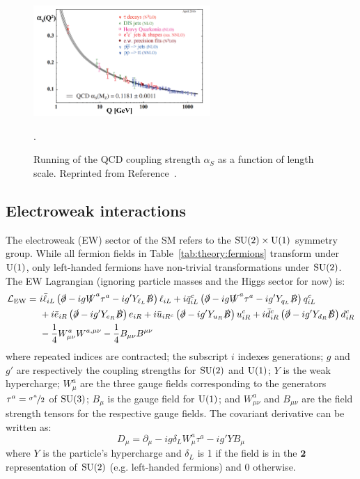 \begin{figure}[]
\begin{center}
    \includegraphics[width=0.6\textwidth]{figures/theory/alphas.png}
    \caption{Running of the QCD coupling strength $\alpha_S$ as a function of length scale.
             Reprinted from Reference~\cite{pdg}.}
    \label{fig:theory:alphas}.
\end{center}
\end{figure}

\subsection{Electroweak interactions}
\label{sec:theory:ew}
The electroweak (EW) sector of the SM refers to the $\operatorname{\mathrm{SU}}(2)\times\operatorname{\mathrm{U}}(1)$ symmetry group.
While all fermion fields in Table~\ref{tab:theory:fermions} transform under $\operatorname{\mathrm{U}}(1)$, only left-handed fermions have non-trivial transformations under $\operatorname{\mathrm{SU}}(2)$.
The EW Lagrangian (ignoring particle masses and the Higgs sector for now) is:
\begin{align}
\mathcal{L}_\mathrm{EW} =~
        & i\bar\ell_{iL} \left(\slashed\partial-ig \slashed W^a \tau^a - ig'Y_{\ell_L} \slashed B\right)\ell_{iL} 
      + i\bar q_{iL}^{c} \left(\slashed\partial-ig \slashed W^a \tau^a - ig'Y_{q_L} \slashed B\right)q_{iL}^{c} \nonumber \\
      & + i\bar e_{iR} \left(\slashed\partial-ig'Y_{ e_R}\slashed B\right) e_{iR} 
       + i\bar u_{iR^{c}} \left(\slashed\partial-ig'Y_{u_R}\slashed B\right) u_{iR}^{c} 
       + i\bar d_{iR}^{c} \left(\slashed\partial-ig'Y_{d_R}\slashed B\right) d_{iR}^{c} \nonumber \\ 
      & - \frac{1}{4} W_{\mu\nu}^a W^{a,\mu\nu} - \frac{1}{4} B_{\mu\nu} B^{\mu\nu}  
      \label{eq:theory:lew}
\end{align}
where repeated indices are contracted; the subscript $i$ indexes generations; $g$ and $g'$ are respectively the coupling strengths for $\operatorname{\mathrm{SU}}(2)$ and $\operatorname{\mathrm{U}}(1)$; $Y$ is the weak hypercharge; $W_\mu^a$ are the three gauge fields corresponding to the generators $\tau^a = \nicefrac{\sigma^a}{2}$ of $\operatorname{\mathrm{SU}}(3)$; $B_\mu$ is the gauge field for $\operatorname{\mathrm{U}}(1)$; and $W_{\mu\nu}^a$ and $B_{\mu\nu}$ are the field strength tensors for the respective gauge fields.
The covariant derivative can be written as:
\begin{equation}
    D_\mu = \partial_\mu - ig\delta_L W^a_\mu \tau^a - ig' YB_\mu
\end{equation}
where $Y$ is the particle's hypercharge and $\delta_L$ is 1 if the field is in the $\mathbf{2}$ representation of $\operatorname{\mathrm{SU}}(2)$ (e.g. left-handed fermions) and 0 otherwise. 

